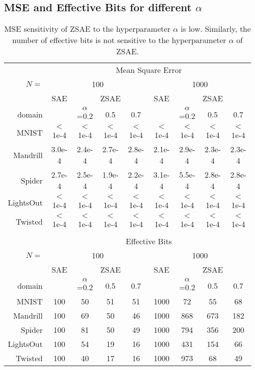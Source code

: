 \documentclass[10pt,letterpaper]{article}
\begin{document}
\subsection{MSE and Effective Bits for different $\alpha$}
\label{more-sensitivity}

\begin{table}[htbp]
 \centering
 \setlength{\tabcolsep}{0.25em}
 \begin{tabular}{|r|*{8}{c|}}
     & \multicolumn{8}{c|}{Mean Square Error} \\
$N=$ & \multicolumn{4}{c|}{100} & \multicolumn{4}{c|}{1000} \\
     & SAE & \multicolumn{3}{c|}{ZSAE} & SAE & \multicolumn{3}{c|}{ZSAE} \\
domain    &   & $\alpha$=0.2 & 0.5  & 0.7 &   & $\alpha$=0.2 & 0.5  & 0.7 \\ 
MNIST     & $<$1e-4 &$<$1e-4& $<$1e-4& $<$1e-4&$<$1e-4 &$<$1e-4 & $<$1e-4 &$<$1e-4 \\ 
Mandrill  & 3.0e-4  &2.4e-4 & 2.7e-4 & 2.8e-4 &2.1e-4  &2.9e-4  & 2.3e-4  &2.3e-4  \\ 
Spider    & 2.7e-4  &2.5e-4 & 1.9e-4 & 2.2e-4 &3.1e-4  &5.5e-4  & 2.8e-4  &2.8e-4  \\ 
LightsOut & $<$1e-4 &$<$1e-4& $<$1e-4& $<$1e-4&$<$1e-4 &$<$1e-4 & $<$1e-4 &$<$1e-4 \\ 
Twisted   & $<$1e-4 &$<$1e-4& $<$1e-4& $<$1e-4&$<$1e-4 &$<$1e-4 & $<$1e-4 &$<$1e-4 \\
\multicolumn{9}{c}{}\\
     & \multicolumn{8}{c|}{Effective Bits} \\
$N=$ & \multicolumn{4}{c|}{100} & \multicolumn{4}{c|}{1000} \\
     & SAE & \multicolumn{3}{c|}{ZSAE} & SAE & \multicolumn{3}{c|}{ZSAE} \\
domain    &   & $\alpha$=0.2 & 0.5  & 0.7 &   & $\alpha$=0.2 & 0.5  & 0.7 \\ 
MNIST     & 100 & 50 & 51 & 51 & 1000 & 72  & 55  & 68 \\ 
Mandrill  & 100 & 69 & 50 & 46 & 1000 & 868 & 673 & 182 \\ 
Spider    & 100 & 81 & 50 & 49 & 1000 & 794 & 356 & 200 \\ 
LightsOut & 100 & 54 & 19 & 16 & 1000 & 431 & 154 & 66 \\ 
Twisted   & 100 & 40 & 17 & 16 & 1000 & 973 & 68  & 49 \\ 
\end{tabular}
 \caption{
MSE sensitivity of ZSAE to the hyperparameter $\alpha$ is low.
Similarly,
the number of effective bits is not sensitive to the hyperparameter $\alpha$ of ZSAE.
}
\label{tab:more-sensitivity}
\end{table}
\end{document}
